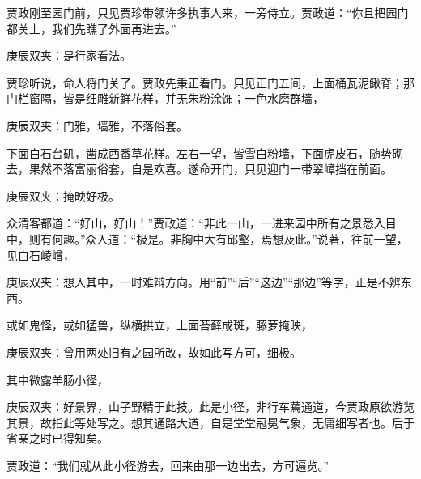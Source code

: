 \begin{parag}
    贾政刚至园门前，只见贾珍带领许多执事人来，一旁侍立。贾政道：“你且把园门都关上，我们先瞧了外面再进去。”\begin{note}庚辰双夹：是行家看法。\end{note}贾珍听说，命人将门关了。贾政先秉正看门。只见正门五间，上面桶瓦泥鳅脊；那门栏窗隔，皆是细雕新鲜花样，并无朱粉涂饰；一色水磨群墙，\begin{note}庚辰双夹：门雅，墙雅，不落俗套。\end{note}下面白石台矶，凿成西番草花样。左右一望，皆雪白粉墙，下面虎皮石，随势砌去，果然不落富丽俗套，自是欢喜。遂命开门，只见迎门一带翠嶂挡在前面。\begin{note}庚辰双夹：掩映好极。\end{note}众清客都道：“好山，好山！”贾政道：“非此一山，一进来园中所有之景悉入目中，则有何趣。”众人道：“极是。非胸中大有邱壑，焉想及此。”说著，往前一望，见白石崚嶒，\begin{note}庚辰双夹：想入其中，一时难辩方向。用“前”“后”“这边”“那边”等字，正是不辨东西。\end{note}或如鬼怪，或如猛兽，纵横拱立，上面苔藓成斑，藤萝掩映，\begin{note}庚辰双夹：曾用两处旧有之园所改，故如此写方可，细极。\end{note}其中微露羊肠小径，\begin{note}庚辰双夹：好景界，山子野精于此技。此是小径，非行车蔫通道，今贾政原欲游览其景，故指此等处写之。想其通路大道，自是堂堂冠冕气象，无庸细写者也。后于省亲之时已得知矣。\end{note}贾政道：“我们就从此小径游去，回来由那一边出去，方可遍览。”
\end{parag}


